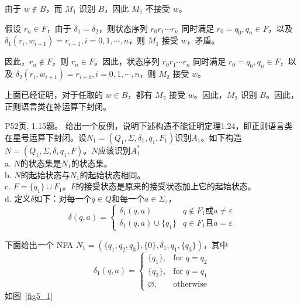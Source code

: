 \documentclass[11pt,addpoints,answers]{exam}
\begin{document}
\begin{questions}
\begin{parts}
\begin{solution}
        由于 \( w \notin B \)，而 \( M_1 \) 识别 \( B \)，因此 \( M_1 \) 不接受 \( w \)。
        
        假设 \( r_n \in F \)，由于 \( \delta_1 = \delta_2 \)，则状态序列 \( r_0r_1 \cdots r_n \) 同时满足 \( r_0 = q_0, q_n \in F \)，以及 \( \delta_1(r_i, w_{i+1}) = r_{i+1}, i = 0, 1, \cdots, n \)，则 \( M_1 \) 接受 \( w \)，矛盾。
        
        因此，\( r_n \notin F \)，则 \( r_n \in F \)。因此，状态序列 \( r_0r_1 \cdots r_n \) 同时满足 \( r_0 = q_0, q_n \in F \)，以及 \( \delta_2(r_i, w_{i+1}) = r_{i+1}, i = 0, 1, \cdots, n \)，则 \( M_2 \) 接受 \( w \)。
        
        上面已经证明，对于任取的 \( w \in B \)，都有 \( M_2 \) 接受 \( w \)。因此，\( M_2 \) 识别 \( B \)。因此，正则语言类在补运算下封闭。
	\end{solution} 
  \end{parts}
  
  \question P52页, 1.15题。
  	给出一个反例，说明下述构造不能证明定理1.24，即正则语言类在星号运算下封闭。设$N_{1}=(Q_{1},\Sigma,\delta_{1},q_{1},F_{1})$识别$A_{1}$。如下构造$N=(Q_{1},\Sigma,\delta,q_{1},F)$。$N$应该识别$A_{1}^{*}$\\	
  	a. $N$的状态集是$N_1$的状态集。\\
  	b. $N$的起始状态与$N_1$的起始状态相同。\\
  	c. $F=\{ q_1\}\cup F_1$。$F$的接受状态是原来的接受状态加上它的起始状态。\\
  	d. 定义$\delta$如下：对每一个$q\in Q$和每一个$a\in \Sigma_\varepsilon$，
  	    \begin{equation*}
  	        \delta(q,a)=
  	        \begin{cases}
  	        \delta_1(q,a)&q\not\in F_1 \text{或}a\neq \varepsilon\\ 
  	        \delta_1(q,a)\cup\{q_1\}&q\in F_1 \text{且}a=\varepsilon
  	        \end{cases}
  	    \end{equation*}
  	
  	\begin{solution}
	    下面给出一个 NFA \(N_1 = (\{q_1, q_2, q_3\}, \{0\}, \delta_1, q_1, \{q_3\})\)，其中
        \[
        \delta_1(q, a) =
        \begin{cases} 
        \{q_1\}, & \text{for } q = q_2 \\
        \{q_2\}, & \text{for } q = q_1 \\
        \varnothing, & \text{otherwise}
        \end{cases}
        \tag{6.1}
        \]
        如图~\ref{fig5_1}
        

\end{solution}
\end{questions}
\end{document}
